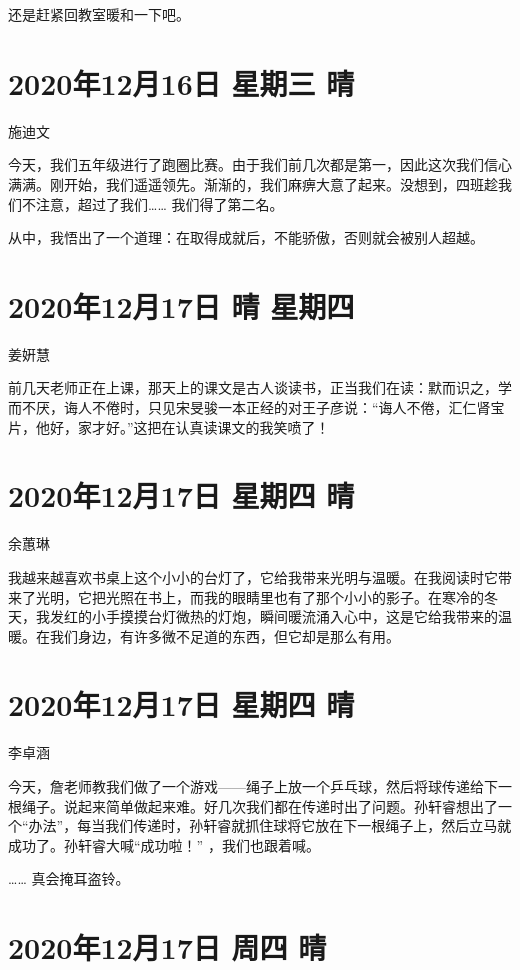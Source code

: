还是赶紧回教室暖和一下吧。

\section{2020年12月16日 星期三 晴}

施迪文

今天，我们五年级进行了跑圈比赛。由于我们前几次都是第一，因此这次我们信心满满。刚开始，我们遥遥领先。渐渐的，我们麻痹大意了起来。没想到，四班趁我们不注意，超过了我们…… 我们得了第二名。

从中，我悟出了一个道理：在取得成就后，不能骄傲，否则就会被别人超越。

\section{2020年12月17日 晴 星期四}

姜姸慧

前几天老师正在上课，那天上的课文是古人谈读书，正当我们在读：默而识之，学而不厌，诲人不倦时，只见宋旻骏一本正经的对王子彦说：“诲人不倦，汇仁肾宝片，他好，家才好。”这把在认真读课文的我笑喷了！

\section{2020年12月17日 星期四 晴}

余蕙琳

我越来越喜欢书桌上这个小小的台灯了，它给我带来光明与温暖。在我阅读时它带来了光明，它把光照在书上，而我的眼睛里也有了那个小小的影子。在寒冷的冬天，我发红的小手摸摸台灯微热的灯炮，瞬间暖流涌入心中，这是它给我带来的温暖。在我们身边，有许多微不足道的东西，但它却是那么有用。

\section{2020年12月17日 星期四 晴}

李卓涵

今天，詹老师教我们做了一个游戏——绳子上放一个乒乓球，然后将球传递给下一根绳子。说起来简单做起来难。好几次我们都在传递时出了问题。孙轩睿想出了一个“办法”，每当我们传递时，孙轩睿就抓住球将它放在下一根绳子上，然后立马就成功了。孙轩睿大喊“成功啦！”
，我们也跟着喊。

…… 真会掩耳盗铃。

\section{2020年12月17日 周四 晴}

